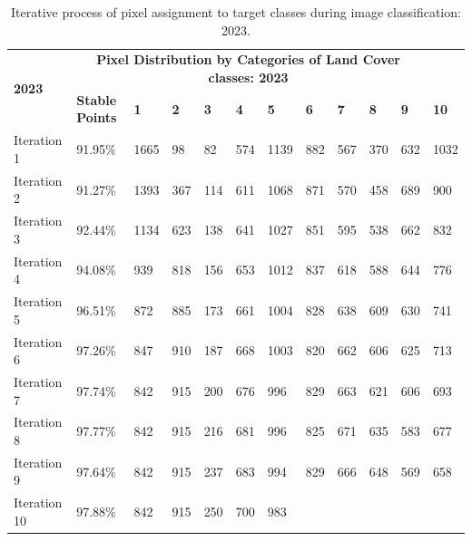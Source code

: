 \documentclass[jimaging,article,accept,pdftex,moreauthors]{Definitions/mdpi}
\begin{document}
\vspace{-6pt}
\begin{table}[H]\footnotesize
 \caption{Iterative process of pixel assignment to target classes during image classification: 2023.}
  \centering
\begin{tabularx}{\textwidth}{p{1.6cm}p{1.8cm}p{0.55cm}p{0.55cm}p{0.55cm}p{0.55cm}p{0.55cm}p{0.55cm}p{0.55cm}p{0.55cm}p{0.55cm}p{0.9cm}}
  \toprule
  \multirow{2}{*}{\textbf{2023}} & \multicolumn{10}{c}{\textbf{Pixel Distribution by Categories of Land Cover classes: 2023}} \\
     & \textbf{Stable Points} %
     & \textbf{1} & \textbf{2} &  \textbf{3} & \textbf{4} & \textbf{5} & \textbf{6} & \textbf{7} & \textbf{8} &\textbf{ 9} & \textbf{10} \\
    \midrule
    Iteration 1 & 91.95\% & 1665    &     98    &     82    &    574   &   1139 &
        882   &     567    &    370    &    632   &    1032 \\
    Iteration 2 & 91.27\% & 1393    &    367    &    114    &    611   &    1068 &
        871    &    570   &     458    &    689  &      900 \\
    Iteration 3 & 92.44\% & 1134    &    623      &  138     &   641  &     1027 &
        851     &   595    &    538      &  662       &  832 \\
    Iteration 4 & 94.08\% & 939     &   818     &   156   &     653   &    1012 &
        837 &       618      &  588 &        644     &   776 \\
    Iteration 5 & 96.51\% & 872     &   885      &  173      &  661   &    1004 &
        828  &      638    &    609    &    630  &      741 \\
    Iteration 6 & 97.26\% & 847    &    910  &      187   &     668     &  1003 &
        820   &     662 &       606    &    625     &   713 \\
    Iteration 7 & 97.74\% & 842    &    915 &       200    &    676   &     996 &
        829      &  663  &      621   &     606  &      693 \\
    Iteration 8 & 97.77\% & 842   &     915   &     216    &    681&        996 &
        825  &      671      &  635   &     583   &     677 \\
    Iteration 9 & 97.64\% & 842    &    915    &    237     &   683 &       994 &
        829     &   666 &       648      &  569  &      658 \\
    Iteration 10 & 97.88\% & 842    &    915    &    250     &   700     &   983 &

\end{tabularx}
\end{table}
\end{document}
